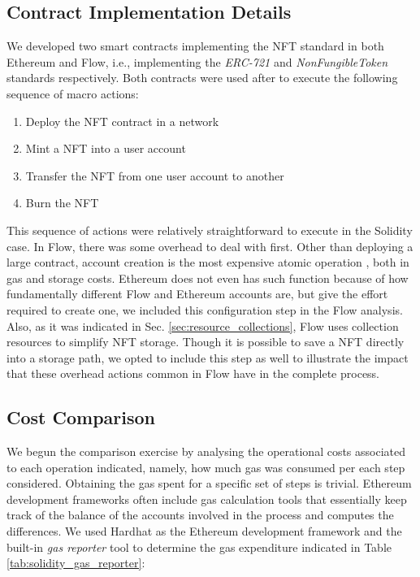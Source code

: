 \documentclass[../NFTComp_IEEE.tex]{subfiles}
\begin{document}
\subsection{Contract Implementation Details}
We developed two smart contracts implementing the NFT standard in both Ethereum and Flow, i.e., implementing the \textit{ERC-721} and \textit{NonFungibleToken} standards respectively. Both contracts were used after to execute the following sequence of macro actions:
\begin{enumerate}
    \item {Deploy the NFT contract in a network}
    \item {Mint a NFT into a user account}
    \item {Transfer the NFT from one user account to another}
    \item {Burn the NFT}
\end{enumerate}

This sequence of actions were relatively straightforward to execute in the Solidity case. In Flow, there was some overhead to deal with first. Other than deploying a large contract, account creation is the most expensive atomic operation \cite{flow2024d}, both in gas and storage costs. Ethereum does not even has such function because of how fundamentally different Flow and Ethereum accounts are, but give the effort required to create one, we included this configuration step in the Flow analysis. Also, as it was indicated in Sec. \ref{sec:resource_collections}, Flow uses collection resources to simplify NFT storage. Though it is possible to save a NFT directly into a storage path, we opted to include this step as well to illustrate the impact that these overhead actions common in Flow have in the complete process.

\subsection{Cost Comparison}
\label{sec:cost_comparison}
We begun the comparison exercise by analysing the operational costs associated to each operation indicated, namely, how much gas was consumed per each step considered. Obtaining the gas spent for a specific set of steps is trivial. Ethereum development frameworks often include gas calculation tools that essentially keep track of the balance of the accounts involved in the process and computes the differences. We used Hardhat as the Ethereum development framework and the built-in \textit{gas reporter} tool to determine the gas expenditure indicated in Table \ref{tab:solidity_gas_reporter}:
\end{document}
